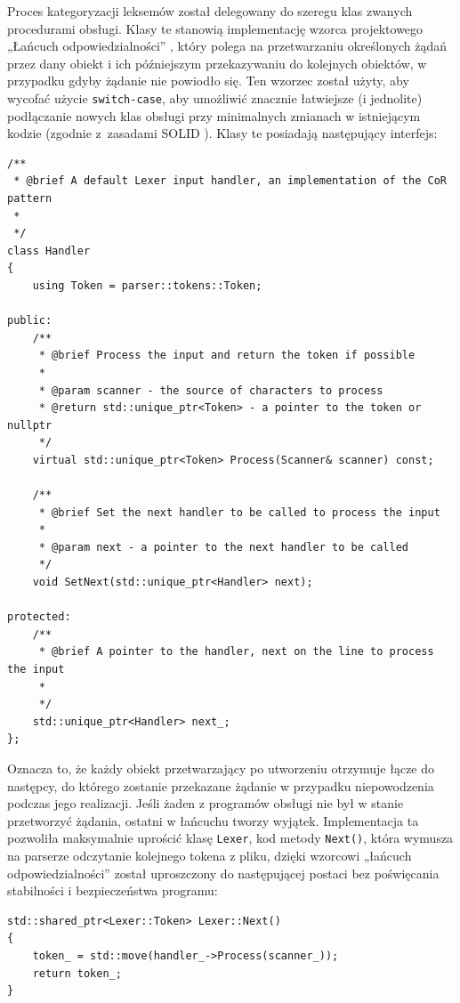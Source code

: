 Proces kategoryzacji leksemów został delegowany do szeregu klas zwanych procedurami obsługi. Klasy te stanowią implementację wzorca projektowego „Łańcuch odpowiedzialności” \cite{cor}, który polega na przetwarzaniu określonych żądań przez dany obiekt i ich późniejszym przekazywaniu do kolejnych obiektów, w przypadku gdyby żądanie nie powiodło się. Ten wzorzec został użyty, aby wycofać użycie \texttt{switch-case}, aby umożliwić znacznie łatwiejsze (i jednolite) podłączanie nowych klas obsługi przy minimalnych zmianach w istniejącym kodzie (zgodnie z~zasadami SOLID \cite{solid}). Klasy te posiadają następujący interfejs:

\begin{lstlisting}[label=list:handler,caption=Klasa Handler,basicstyle=\footnotesize\ttfamily]
/**
 * @brief A default Lexer input handler, an implementation of the CoR pattern
 * 
 */
class Handler
{
    using Token = parser::tokens::Token;
    
public:
    /**
     * @brief Process the input and return the token if possible
     * 
     * @param scanner - the source of characters to process
     * @return std::unique_ptr<Token> - a pointer to the token or nullptr 
     */
    virtual std::unique_ptr<Token> Process(Scanner& scanner) const;
    
    /**
     * @brief Set the next handler to be called to process the input
     * 
     * @param next - a pointer to the next handler to be called
     */
    void SetNext(std::unique_ptr<Handler> next);
    
protected:
    /**
     * @brief A pointer to the handler, next on the line to process the input
     * 
     */
    std::unique_ptr<Handler> next_;
};
\end{lstlisting}

Oznacza to, że każdy obiekt przetwarzający po utworzeniu otrzymuje łącze do następcy, do którego zostanie przekazane żądanie w przypadku niepowodzenia podczas jego realizacji. Jeśli żaden z programów obsługi nie był w stanie przetworzyć żądania, ostatni w łańcuchu tworzy wyjątek. Implementacja ta pozwoliła maksymalnie uprościć klasę \texttt{Lexer}, kod metody \texttt{Next()}, która wymusza na parserze odczytanie kolejnego tokena z pliku, dzięki wzorcowi „łańcuch odpowiedzialności” \cite{cor} został uproszczony do następującej postaci bez poświęcania stabilności i bezpieczeństwa programu:

\begin{lstlisting}[label=list:scanner,caption=Metoda Lexer::Next(),basicstyle=\footnotesize\ttfamily]
std::shared_ptr<Lexer::Token> Lexer::Next()
{
    token_ = std::move(handler_->Process(scanner_));
    return token_;
}
\end{lstlisting}

